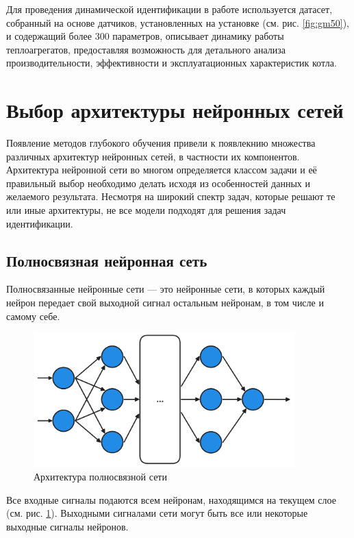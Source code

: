 Для проведения динамической идентификации в работе используется датасет,
собранный на основе датчиков, установленных на установке (см. рис.
\ref{fig:gm50}), и содержащий более 300 параметров, описывает динамику работы
теплоагрегатов, предоставляя возможность для детального анализа
производительности, эффективности и эксплуатационных характеристик котла.

\section{Выбор архитектуры нейронных сетей}

Появление методов глубокого обучения привели к появлекнию множества различных
архитектур нейронных сетей, в частности их компонентов. Архитектура нейронной
сети во многом определяется классом задачи и её правильный выбор необходимо
делать исходя из особенностей данных и желаемого результата. Несмотря на широкий
спектр задач, которые решают те или иные архитектуры, не все модели подходят для
решения задач идентификации.

\subsection{Полносвязная нейронная сеть}

Полносвязанные нейронные сети — это нейронные сети, в которых каждый нейрон
передает свой выходной сигнал остальным нейронам, в том числе и самому себе. 

\begin{figure}[H]
  \centering
    \includegraphics[width=0.9\textwidth]{figures/arch_fully_connected.png}
  \caption{Архитектура полносвязной сети}\label{fig:dense_nn}
\end{figure}

Все входные сигналы подаются всем нейронам, находящимся на текущем слое (см.
рис. \ref{fig:dense_nn}). Выходными сигналами сети могут быть все или некоторые
выходные сигналы нейронов.

